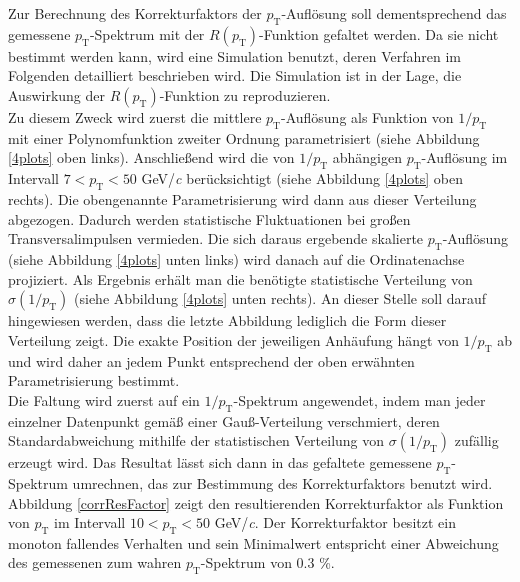 \documentclass[12pt,a4paper]{report}
\begin{document}
Zur Berechnung des Korrekturfaktors der $p_{\mathrm{T}}$-Auflösung soll dementsprechend das gemessene $p_{\mathrm{T}}$-Spektrum mit der $R(p_{\mathrm{T}})$-Funktion gefaltet werden. Da sie nicht bestimmt werden kann, wird eine Simulation benutzt, deren Verfahren im Folgenden detailliert beschrieben wird. Die Simulation ist in der Lage, die Auswirkung der $R(p_{\mathrm{T}})$-Funktion zu reproduzieren.\\
Zu diesem Zweck wird zuerst die mittlere $p_{\mathrm{T}}$-Auflösung als Funktion von $1/p_{\mathrm{T}}$ mit einer Polynomfunktion zweiter Ordnung parametrisiert (siehe Abbildung \ref{4plots} oben links). Anschließend wird die von $1/p_{\mathrm{T}}$ abhängigen $p_{\mathrm{T}}$-Auflösung im Intervall $7 < p_{\mathrm{T}} < 50$ GeV/\textit{c} berücksichtigt (siehe Abbildung \ref{4plots} oben rechts). Die obengenannte Parametrisierung wird dann aus dieser Verteilung abgezogen. Dadurch werden statistische Fluktuationen bei großen Transversalimpulsen vermieden. Die sich daraus ergebende skalierte $p_{\mathrm{T}}$-Auflösung (siehe Abbildung \ref{4plots} unten links) wird danach auf die Ordinatenachse projiziert. Als Ergebnis erhält man die benötigte statistische Verteilung von $\sigma(1/p_{\mathrm{T}})$ (siehe Abbildung \ref{4plots} unten rechts). An dieser Stelle soll darauf hingewiesen werden, dass die letzte Abbildung lediglich die Form dieser Verteilung zeigt. Die exakte Position der jeweiligen Anhäufung hängt von $1/p_{\mathrm{T}}$ ab und wird daher an jedem Punkt entsprechend der oben erwähnten Parametrisierung bestimmt.\\ 
Die Faltung wird zuerst auf ein $1/p_{\mathrm{T}}$-Spektrum angewendet, indem man jeder einzelner Datenpunkt gemäß einer Gauß-Verteilung verschmiert, deren Standardabweichung mithilfe der statistischen Verteilung von $\sigma(1/p_{\mathrm{T}})$ zufällig erzeugt wird. Das Resultat lässt sich dann in das gefaltete gemessene $p_{\mathrm{T}}$-Spektrum umrechnen, das zur Bestimmung des Korrekturfaktors benutzt wird. Abbildung \ref{corrResFactor} zeigt den resultierenden Korrekturfaktor als Funktion von $p_{\mathrm{T}}$ im Intervall $10 < p_{\mathrm{T}} < 50$ GeV/\textit{c}. Der Korrekturfaktor besitzt ein monoton fallendes Verhalten und sein Minimalwert entspricht einer Abweichung des gemessenen zum wahren $p_{\mathrm{T}}$-Spektrum von $0.3$ \%.
\end{document}
